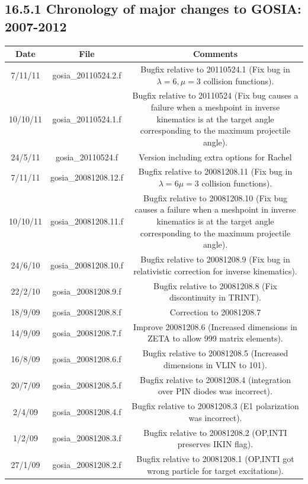 \documentclass[10pt]{article}
\begin{document}
\subsection*{16.5.1 Chronology of major changes to GOSIA: 2007-2012}
\begin{center}
\begin{tabular}{|c|c|c|}
\hline
Date & File & Comments \\
\hline
7/11/11 & gosia\_20110524.2.f & Bugfix relative to 20110524.1 (Fix bug in $\lambda=6, \mu=3$ collision functions). \\
\hline
10/10/11 & gosia\_20110524.1.f & Bugfix relative to 20110524 (Fix bug causes a failure when a meshpoint in inverse kinematics is at the target angle corresponding to the maximum projectile angle). \\
\hline
24/5/11 & gosia\_20110524.f & Version including extra options for Rachel \\
\hline
7/11/11 & gosia\_20081208.12.f & Bugfix relative to 20081208.11 (Fix bug in $\lambda=6 \mu=3$ collision functions). \\
\hline
10/10/11 & gosia\_20081208.11.f & Bugfix relative to 20081208.10 (Fix bug causes a failure when a meshpoint in inverse kinematics is at the target angle corresponding to the maximum projectile angle). \\
\hline
24/6/10 & gosia\_20081208.10.f & Bugfix relative to 20081208.9 (Fix bug in relativistic correction for inverse kinematics). \\
\hline
22/2/10 & gosia\_20081208.9.f & Bugfix relative to 20081208.8 (Fix discontinuity in TRINT). \\
\hline
18/9/09 & gosia\_20081208.8.f & Correction to 20081208.7 \\
\hline
14/9/09 & gosia\_20081208.7.f & Improve 20081208.6 (Increased dimensions in ZETA to allow 999 matrix elements). \\
\hline
16/8/09 & gosia\_20081208.6.f & Bugfix relative to 20081208.5 (Increased dimensions in VLIN to 101). \\
\hline
20/7/09 & gosia\_20081208.5.f & Bugfix relative to 20081208.4 (integration over PIN diodes was incorrect). \\
\hline
2/4/09 & gosia\_20081208.4.f & Bugfix relative to 20081208.3 (E1 polarization was incorrect). \\
\hline
1/2/09 & gosia\_20081208.3.f & Bugfix relative to 20081208.2 (OP,INTI preserves IKIN flag). \\
\hline
27/1/09 & gosia\_20081208.2.f & Bugfix relative to 20081208.1 (OP,INTI got wrong particle for target excitations). \\

\end{tabular}
\end{center}
\end{document}
